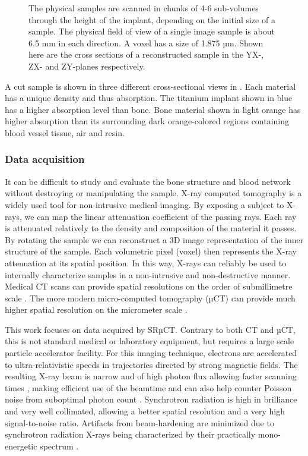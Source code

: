 \begin{figure}
\begin{tabular}{cc}
  \end{tabular}
  \caption{
	The physical samples are scanned in chunks of 4-6 sub-volumes through
	the height of the implant, depending on the initial size of a sample.
	The physical field of view of a single image sample is about 6.5 mm in
	each direction. A voxel has a size of 1.875 µm.  Shown here are the
	cross sections of a reconstructed sample in the YX-, ZX- and ZY-planes
	respectively.
  }
\label{fig:3viewsample}
\end{figure}

A cut sample is shown in three different cross-sectional views in
. Each material has a unique density and thus absorption.
The titanium implant shown in blue has a higher absorption level than bone.
Bone material shown in light orange has higher absorption than its surrounding
dark orange-colored regions containing blood vessel tissue, air and resin.

\subsubsection{Data acquisition}

It can be difficult to study and evaluate the bone structure and blood network
without destroying or manipulating the sample. X-ray computed tomography is a
widely used tool for non-intrusive medical imaging. By exposing a subject to
X-rays, we can map the linear attenuation coefficient of the passing rays. Each
ray is attenuated relatively to the density and composition of the material it
passes. By rotating the sample we can reconstruct a 3D image representation of
the inner structure of the sample. Each volumetric pixel (voxel) then
represents the X-ray attenuation at its spatial position. In this way, X-rays
can reliably be used to internally characterize samples in a non-intrusive and
non-destructive manner. Medical CT scans can provide spatial resolutions on the
order of submillimetre scale \cite{medicalct}. The more modern micro-computed
tomography (µCT) can provide much higher spatial resolution on the micrometer
scale \cite{srexptime}.

This work focuses on data acquired by SRµCT.  Contrary to both CT and µCT, this
is not standard medical or laboratory equipment, but requires a large scale
particle accelerator facility.  For this imaging technique, electrons are
accelerated to ultra-relativistic speeds in trajectories directed by strong
magnetic fields. The resulting X-ray beam is narrow and of high photon flux
allowing faster scanning times \cite{srexptime}, making efficient use of the
beamtime and can also help counter Poisson noise from suboptimal photon count
\cite{srnoise}. Synchrotron radiation is high in brilliance and very well
collimated, allowing a better spatial resolution and a very high signal-to-noise
ratio.  Artifacts from beam-hardening are minimized due to synchrotron radiation
X-rays being characterized by their practically mono-energetic spectrum
\cite{srbeamquality}.

